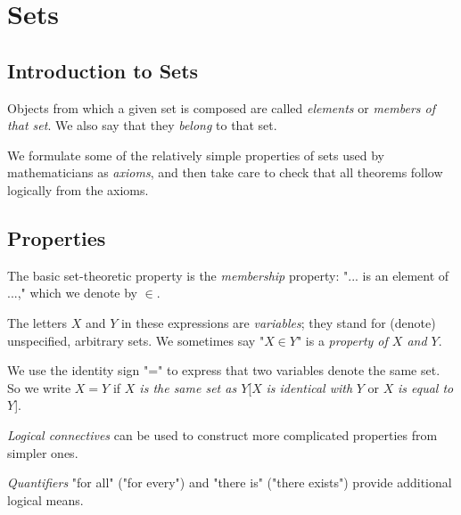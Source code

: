 \documentclass[12pt,a4paper,twoside,openany]{book}
\begin{document}

\restoregeometry
\thispagestyle{empty}
\setcounter{page}{0}
\tableofcontents
\thispagestyle{empty}
\setcounter{page}{0}


\chapter{Sets}
\section{Introduction to Sets}

Objects from which a given set is composed are called \textit{elements} or \textit{members of that set}. We also say that they \textit{belong} to that set.

We formulate some of the relatively simple properties of sets used by mathematicians as \textit{axioms}, and then take care to check that all theorems follow logically from the axioms.

\section{Properties}

The basic set-theoretic property is the \textit{membership} property: "... is an element of ...," which we denote by $\in$.

The letters $X$ and $Y$ in these expressions are \textit{variables}; they stand for (denote) unspecified, arbitrary sets. We sometimes say "$X\in Y$" is a \textit{property of $X$ and $Y$}.

We use the identity sign "=" to express that two variables denote the same set. So we write $X=Y$ if \textit{$X$ is the same set as $Y$}[$X$ \textit{is identical with} $Y$ or $X$ \textit{is equal to} $Y$].

\textit{Logical connectives} can be used to construct more complicated properties from simpler ones.

\textit{Quantifiers} "for all" ("for every") and "there is" ("there exists") provide additional logical means.
\end{document}
